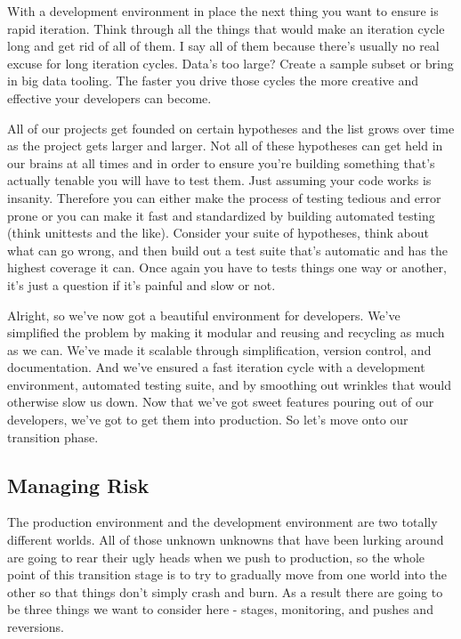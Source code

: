 \documentclass[10pt,a5paper]{book}
\begin{document}
With a development environment in place the next thing you want to ensure is rapid iteration. Think through all the things that would make an iteration cycle long and get rid of all of them. I say all of them because there's usually no real excuse for long iteration cycles. Data's too large? Create a sample subset or bring in big data tooling. The faster you drive those cycles the more creative and effective your developers can become. 

All of our projects get founded on certain hypotheses and the list grows over time as the project gets larger and larger. Not all of these hypotheses can get held in our brains at all times and in order to ensure you're building something that's actually tenable you will have to test them. Just assuming your code works is insanity. Therefore you can either make the process of testing tedious and error prone or you can make it fast and standardized by building automated testing (think unittests and the like). Consider your suite of hypotheses, think about what can go wrong, and then build out a test suite that's automatic and has the highest coverage it can. Once again you have to tests things one way or another, it's just a question if it's painful and slow or not. 

Alright, so we've now got a beautiful environment for developers. We've simplified the problem by making it modular and reusing and recycling as much as we can. We've made it scalable through simplification, version control, and documentation. And we've ensured a fast iteration cycle with a development environment, automated testing suite, and by smoothing out wrinkles that would otherwise slow us down. Now that we've got sweet features pouring out of our developers, we've got to get them into production. So let's move onto our transition phase.

\subsection{Managing Risk}
The production environment and the development environment are two totally different worlds. All of those unknown unknowns that have been lurking around are going to rear their ugly heads when we push to production, so the whole point of this transition stage is to try to gradually move from one world into the other so that things don't simply crash and burn. As a result there are going to be three things we want to consider here - stages, monitoring, and pushes and reversions. 
\end{document}
